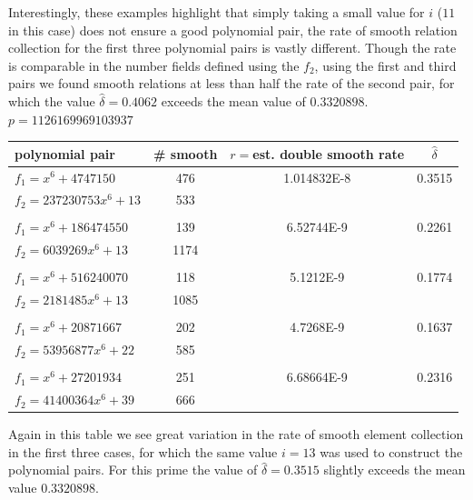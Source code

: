 \documentclass[a4paper, 10pt, envcountsect, runningheads]{article}
\numberwithin{figure}{section}
\numberwithin{equation}{section}
\begin{document}
Interestingly, these examples highlight that simply taking a small value for $i$ ($11$ in this case) does not ensure a good polynomial pair, the rate of smooth relation collection for the first three polynomial pairs is vastly different. Though the rate is comparable in the number fields defined using the $f_2$, using the first and third pairs we found smooth relations at less than half the rate of the second pair, for which the value $\hat{\delta}=0.4062$ exceeds the mean value of $0.3320898$.\\


$p=1126169969103937$
\vspace{0.5cm}
\begin{center}
\begin{tabular}{l|ccc}
polynomial pair & \# smooth & $r=$est. double smooth rate & $\hat{\delta}$\\
\hline
$f_1=x^6+4747150$ &476&1.014832E-8&0.3515\\
$f_2=237230753x^6+13$ &533&&\\
&&&\\
$f_1=x^6+186474550$ &139&6.52744E-9&0.2261\\
$f_2=6039269x^6+13$ &1174&&\\
&&&\\
$f_1=x^6+516240070$ &118&5.1212E-9&0.1774\\
$f_2=2181485x^6+13$ &1085&&\\
&&&\\
$f_1=x^6+20871667$ &202&4.7268E-9&0.1637\\
$f_2=53956877x^6+22$ &585&&\\
&&&\\
$f_1=x^6+27201934$ &251&6.68664E-9&0.2316\\
$f_2=41400364x^6+39$ &666&&\\
\end{tabular}
\end{center}
\vspace{0.5cm}
Again in this table we see great variation in the rate of smooth element collection in the first three cases, for which the same value $i=13$ was used to construct the polynomial pairs. For this prime the value of $\hat{\delta}=0.3515$ slightly exceeds the mean value $0.3320898$.
\end{document}
